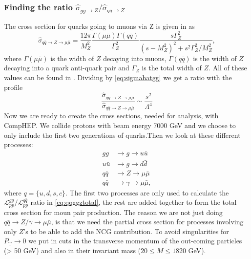 \subsubsection{Finding the ratio ${\hat \sigma_{gg \rightarrow Z}}/{\hat \sigma_{q \bar q \rightarrow Z}}$}
The cross section for quarks going to muons via Z is given in \cite{amsler2008rpp} as
\begin{equation}
	\hat \sigma_{q \bar q \rightarrow Z \rightarrow \mu \bar \mu} = \frac{12 \pi}{M_{Z}^{2}}\frac{\Gamma(\mu \bar \mu)\Gamma(q\bar q)}{\Gamma^{2}_{Z}}\frac{s\Gamma^{2}_{Z}}{(s-M_{Z}^{2})^{2}+s^{2}\Gamma_{Z}^{2}/M_{Z}^{2}},
\end{equation}
where $\Gamma(\mu \bar \mu)$ is the width of $Z$ decaying into muons, $\Gamma(q \bar q)$ is the width of $Z$ decaying into a quark anti-quark pair and $\Gamma_Z$ is the total width of $Z$. All of these values can be found in \cite{amsler2008rpp}. Dividing by \ref{eq:sigmahatgg} we get a ratio with the profile
\begin{equation}
	\frac{\hat \sigma_{gg \rightarrow Z \rightarrow \mu \bar \mu}}{\hat \sigma_{q \bar q \rightarrow Z \rightarrow \mu \bar \mu}} \sim \frac{s^{2}}{\Lambda^{4}}
\end{equation}
Now we are ready to create the cross sections, needed for analysis, with CompHEP. We collide protons with beam energy 7000 GeV and we choose to only include tho first two generations of quarks.Then we look at these different processes:
\begin{align}
gg &\rightarrow g \rightarrow u \bar u \nonumber \\ \nonumber
u \bar u &\rightarrow g \rightarrow d \bar d \\ \nonumber
q \bar q &\rightarrow Z \rightarrow \mu \bar \mu \\ \nonumber
q \bar q &\rightarrow \gamma \rightarrow \mu \bar \mu,
\end{align}
where $q = \{u,d,s,c\}$. The first two processes are only used to calculate the ${\mathcal{L}_{pp}^{gg}}/{\mathcal{L}_{pp}^{q \bar q}}$ ratio in \eqref{eq:qqggztotal}, the rest are added together to form the total cross section for moun pair production. The reason we are not just doing $q \bar q \rightarrow Z/ \gamma \rightarrow \mu \bar \mu$, is that we need the partial cross section for processes involving only $Z$'s to be able to add the NCG contribution. To avoid singularities for $P_\textrm{T} \rightarrow 0$ we put in cuts in the transverse momentum of the out-coming particles (> 50 GeV) and also in their invariant mass ($20 \leq M \leq 1820$ GeV).

